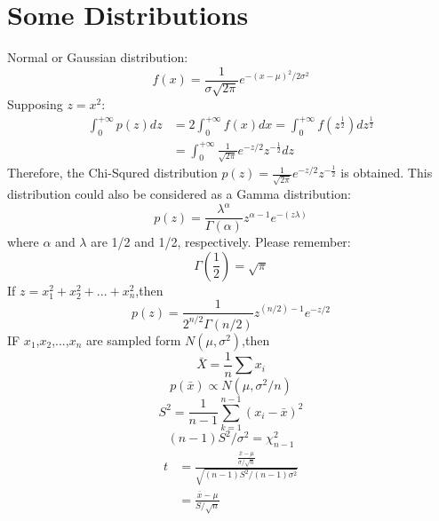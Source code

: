\documentclass{article}
\begin{document}
\section{Some Distributions}
Normal or Gaussian distribution:
\begin{equation}
    f(x)=\frac{1}{\sigma\sqrt{2\pi}}e^{-(x-\mu)^2/2\sigma^{2}}
\end{equation}
Supposing $z=x^{2}$:
\begin{equation}
    \begin{split}
    \int_{0}^{+\infty} p(z)dz&=2\int_{0}^{+\infty} f(x)dx=\int_{0}^{+\infty} f(z^{\frac{1}{2}})dz^{\frac{1}{2}}\\
    &=\int_{0}^{+\infty} \frac{1}{\sqrt{2\pi}}e^{-z/2}z^{-\frac{1}{2}}dz
    \end{split}
\end{equation}
Therefore, the Chi-Squred distribution $p(z)=\frac{1}{\sqrt{2\pi}}e^{-z/2}z^{-\frac{1}{2}}$ is obtained. This distribution 
could also be considered as a Gamma distribution:
\begin{equation}
p(z)=\frac{\lambda^{\alpha}}{\Gamma (\alpha)}z^{\alpha-1}e^{-(z\lambda)}
\end{equation}
where $\alpha$ and $\lambda$ are 1/2 and 1/2, respectively. Please remember:
\begin{equation}
\Gamma(\frac{1}{2})=\sqrt\pi
\end{equation}
If $z=x_{1}^{2}+x_{2}^{2}+...+x_{n}^{2}$,then
\begin{equation}
    p(z)=\frac{1}{2^{n/2}\Gamma(n/2)}z^{(n/2)-1}e^{-z/2}
\end{equation}
IF $x_{1}$,$x_{2}$,...,$x_{n}$ are sampled form $N(\mu,\sigma^{2})$,then
\begin{equation}
    \bar{X}=\frac{1}{n}\sum x_{i}
\end{equation}
\begin{equation}
    p(\bar{x})\propto N(\mu,\sigma^{2}/n)
\end{equation}
\begin{equation}
S^{2}=\frac{1}{n-1}\sum_{k=1}^{n-1}(x_{i}-\bar{x})^{2}
\end{equation}
\begin{equation}
    (n-1)S^{2}/\sigma^{2}=\chi_{n-1}^{2}
\end{equation}
\begin{equation}
    \begin{split}
    t&=\frac{\frac{\bar{x}-\mu}{\sigma/\sqrt{n}}}{\sqrt{(n-1)S^{2}/(n-1)\sigma^{2}}}\\
    &=\frac{\bar{x}-\mu}{S/\sqrt{n}}
    \end{split}
\end{equation}
\end{document}
